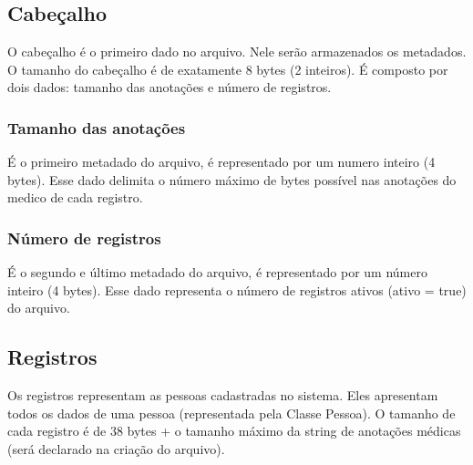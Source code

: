 \subsection{\esp Cabeçalho}

O cabeçalho é o primeiro dado no arquivo. Nele serão armazenados os metadados. O tamanho do cabeçalho é de exatamente 8 bytes (2 inteiros). É composto por dois dados: tamanho das anotações e número de registros.

\subsubsection{\esp Tamanho das anotações}

É o primeiro metadado do arquivo, é representado por um numero inteiro (4 bytes). Esse dado delimita o número máximo de bytes possível nas anotações do medico de cada registro.


\subsubsection{\esp Número de registros}

É o segundo e último metadado do arquivo, é representado por um número inteiro (4 bytes). Esse dado representa o número de registros ativos (ativo = true) do arquivo.

\subsection{\esp Registros}

Os registros representam as pessoas cadastradas no sistema. Eles apresentam todos os dados de uma pessoa (representada pela Classe Pessoa).
O tamanho de cada registro é de 38 bytes + o tamanho máximo da string de anotações médicas (será declarado na criação do arquivo).
